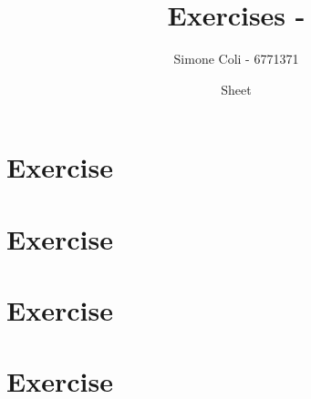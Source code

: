 \documentclass{article}
\title{Exercises - }
\author{Simone Coli - 6771371}
\date{Sheet }
\begin{document}
\maketitle

\section{Exercise}
\section{Exercise}
\section{Exercise}
\section{Exercise}
\end{document}
